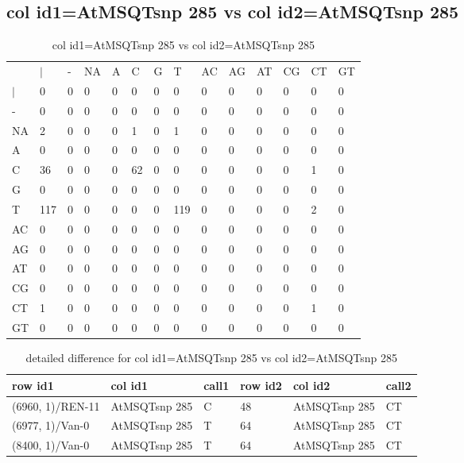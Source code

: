 \subsection{col id1=AtMSQTsnp 285 vs col id2=AtMSQTsnp 285}
\begin{center}
\begin{longtable}{|l|l|l|l|l|l|l|l|l|l|l|l|l|l|}
\caption{col id1=AtMSQTsnp 285 vs col id2=AtMSQTsnp 285} \label{table_dm826}\\
\hline
\\
\hline
&$|$&-&NA&A&C&G&T&AC&AG&AT&CG&CT&GT\\
$|$&0&0&0&0&0&0&0&0&0&0&0&0&0\\
-&0&0&0&0&0&0&0&0&0&0&0&0&0\\
NA&2&0&0&0&1&0&1&0&0&0&0&0&0\\
A&0&0&0&0&0&0&0&0&0&0&0&0&0\\
C&36&0&0&0&62&0&0&0&0&0&0&1&0\\
G&0&0&0&0&0&0&0&0&0&0&0&0&0\\
T&117&0&0&0&0&0&119&0&0&0&0&2&0\\
AC&0&0&0&0&0&0&0&0&0&0&0&0&0\\
AG&0&0&0&0&0&0&0&0&0&0&0&0&0\\
AT&0&0&0&0&0&0&0&0&0&0&0&0&0\\
CG&0&0&0&0&0&0&0&0&0&0&0&0&0\\
CT&1&0&0&0&0&0&0&0&0&0&0&1&0\\
GT&0&0&0&0&0&0&0&0&0&0&0&0&0\\
\hline
\end{longtable}
\end{center}

\begin{center}
\begin{longtable}{|l|l|l|l|l|l|}
\caption{detailed difference for col id1=AtMSQTsnp 285 vs col id2=AtMSQTsnp 285} \label{table_dm827}\\
\hline
row id1&col id1&call1&row id2&col id2&call2\\
\hline
(6960, 1)/REN-11&AtMSQTsnp 285&C&48&AtMSQTsnp 285&CT\\
(6977, 1)/Van-0&AtMSQTsnp 285&T&64&AtMSQTsnp 285&CT\\
(8400, 1)/Van-0&AtMSQTsnp 285&T&64&AtMSQTsnp 285&CT\\
\hline
\end{longtable}
\end{center}

